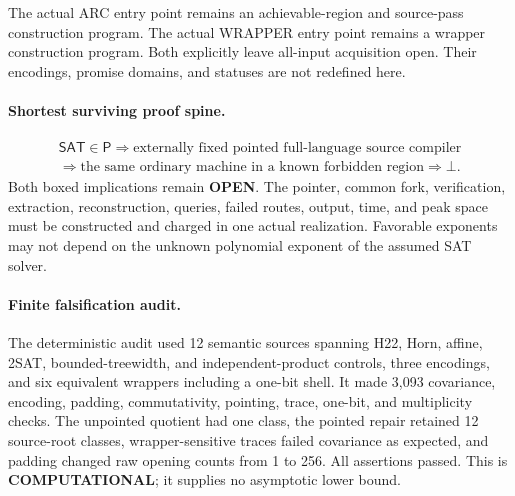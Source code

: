 \documentclass[11pt]{article}
\newcommand{\statusopen}{\textcolor{openstatus}{\textbf{OPEN}}}
\begin{document}
The actual ARC entry point  remains an achievable-region and
source-pass construction program. The actual WRAPPER entry point
 remains a wrapper construction program. Both explicitly
leave all-input acquisition open. Their encodings, promise domains, and
statuses are not redefined here.

\paragraph{Shortest surviving proof spine.}
\[
\begin{gathered}
\mathsf{SAT}\in\mathsf P
\Longrightarrow
\boxed{\text{externally fixed pointed full-language source compiler}}\\
\Longrightarrow
\boxed{\text{the same ordinary machine in a known forbidden region}}
\Longrightarrow\bot .
\end{gathered}
\]
Both boxed implications remain \statusopen. The pointer, common fork,
verification, extraction, reconstruction, queries, failed routes, output,
time, and peak space must be constructed and charged in one actual
realization. Favorable exponents may not depend on the unknown polynomial
exponent of the assumed SAT solver.

\paragraph{Finite falsification audit.}
The deterministic audit used 12 semantic sources spanning H22, Horn, affine,
2SAT, bounded-treewidth, and independent-product controls, three encodings,
and six equivalent wrappers including a one-bit shell. It made 3,093
covariance, encoding, padding, commutativity, pointing, trace, one-bit, and
multiplicity checks. The unpointed quotient had one class, the pointed repair
retained 12 source-root classes, wrapper-sensitive traces failed covariance as
expected, and padding changed raw opening counts from 1 to 256. All assertions
passed. This is \textbf{COMPUTATIONAL}; it supplies no asymptotic lower bound.
\end{document}
